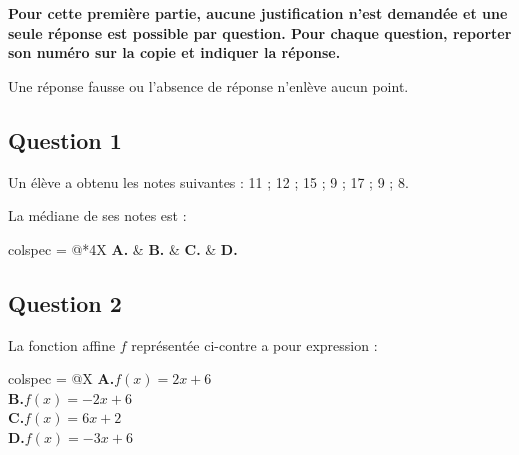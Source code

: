 \textbf{Pour cette première partie, aucune justification n'est demandée et une seule réponse est possible par question. Pour chaque question, reporter son numéro sur la copie et indiquer la réponse.}

Une réponse fausse ou l'absence de réponse n'enlève aucun point.

\subsection*{Question 1}

Un élève a obtenu les notes suivantes : 11 ; 12 ; 15 ; 9 ; 17 ; 9 ; 8.

La médiane de ses notes est :

\medskip
\begin{tblr}{colspec = {@{}*{4}{X}}}
	\textbf{A.} &
	\textbf{B.} &
	\textbf{C.} &
	\textbf{D.} \\
\end{tblr}

\subsection*{Question 2}

\begin{minipage}[t]{0.6\linewidth}
	La fonction affine $f$ représentée ci-contre a pour expression :

	\medskip
	\begin{tblr}{colspec = {@{}X}}
		\textbf{A.}\quad $f(x) = 2x+6$ \\
		\textbf{B.}\quad $f(x) = -2x+6$ \\
		\textbf{C.}\quad $f(x) = 6x+2$ \\
		\textbf{D.}\quad $f(x) = -3x+6$ \\
	\end{tblr}
\end{minipage}
\hfill
{}


